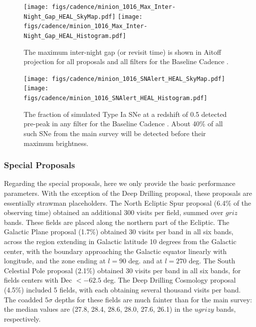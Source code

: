 \begin{figure}[t!]
\vskip -0.0in
\texttt{[image: figs/cadence/minion\_1016\_Max\_Inter-Night\_Gap\_HEAL\_SkyMap.pdf]}
\texttt{[image: figs/cadence/minion\_1016\_Max\_Inter-Night\_Gap\_HEAL\_Histogram.pdf]}
\vskip -0.1in
\caption{The maximum inter-night gap (or revisit time) is shown in Aitoff projection
for all proposals and all filters for the Baseline Cadence .}
\label{fig:enigmaMAXGapAll}
\end{figure}



\begin{figure}[h!]
\vskip -0.0in
\texttt{[image: figs/cadence/minion\_1016\_SNAlert\_HEAL\_SkyMap.pdf]}
\texttt{[image: figs/cadence/minion\_1016\_SNAlert\_HEAL\_Histogram.pdf]}
\vskip -0.1in

\caption{The fraction of simulated Type Ia SNe at a redshift of 0.5 detected
pre-peak in any filter for the Baseline Cadence . About
40\% of all such SNe from the main survey will be detected before their
maximum brightness.}
\label{fig:enigmaEarlySNe}
\end{figure}



\subsubsection{Special Proposals}

Regarding the special proposals, here we only provide the basic
performance parameters. With the exception of the Deep Drilling
proposal, these proposals are essentially strawman placeholders. The
North Ecliptic Spur proposal (6.4\% of the observing time) obtained an
additional 300 visits per field, summed over $griz$ bands. These
fields are placed along the northern part of the Ecliptic. The
Galactic Plane proposal (1.7\%) obtained 30 visits per band in all six
bands, across the region extending in Galactic latitude 10 degrees
from the Galactic center, with the boundary approaching the Galactic
equator linearly with longitude, and the zone ending at $l=90$ deg.
and at $l=270$ deg. The South Celestial Pole proposal (2.1\%) obtained
30 visits per band in all six bands, for fields centers with Dec $<
-62.5$ deg. The Deep Drilling Cosmology proposal (4.5\%) included 5
fields, with each obtaining several thousand visits per band. The
coadded $5\sigma$ depths for these fields are much fainter than for
the main survey: the median values are (27.8, 28.4, 28.6, 28.0, 27.6,
26.1) in the $ugrizy$ bands, respectively.


